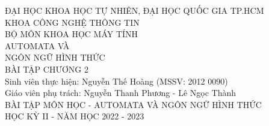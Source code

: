 \documentclass[12pt, a4paper]{article}
\begin{document}
	

	\begin{titlepage}
		\centering
		\large
		ĐẠI HỌC KHOA HỌC TỰ NHIÊN, ĐẠI HỌC QUỐC GIA TP.HCM\\[.1in]
		KHOA CÔNG NGHỆ THÔNG TIN\\BỘ MÔN KHOA HỌC MÁY TÍNH\\
		\vfill
		\huge AUTOMATA VÀ\\NGÔN NGỮ HÌNH THỨC\\[.1in]
		\LARGE BÀI TẬP CHƯƠNG 2\\
		\vfill
		\RaggedRight
		\large
		Sinh viên thực hiện: Nguyễn Thế Hoàng (MSSV: 2012 0090)\\[.1in]
		Giáo viên phụ trách: Nguyễn Thanh Phương - Lê Ngọc Thành\\[.2in]
		\Centering
		BÀI TẬP MÔN HỌC - AUTOMATA VÀ NGÔN NGỮ HÌNH THỨC\\[.1in]
		HỌC KỲ II - NĂM HỌC 2022 - 2023
	\end{titlepage}
	
	\newpage	
	
	
\end{document}
